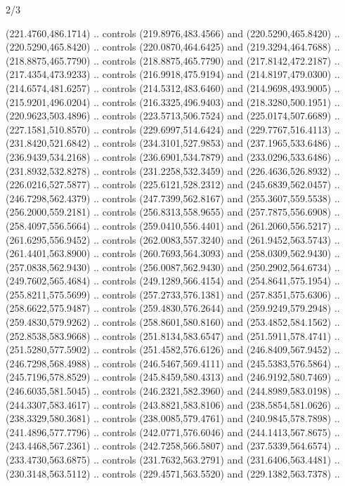 \begin{flagdescription}{2/3}
\begin{scope}[shift={(0.5\flaglength,0.5)},scale=\flagwidth/545]
\begin{scope}[y=0.80pt, x=0.80pt, yscale=-1,shift={(-297,-430)}]
\begin{scope}[shift={(28.51887,-25.61095)}]
  (221.4760,486.1714) .. controls (219.8976,483.4566) and (220.5290,465.8420) ..
  (220.5290,465.8420) .. controls (220.0870,464.6425) and (219.3294,464.7688) ..
  (218.8875,465.7790) .. controls (218.8875,465.7790) and (217.8142,472.2187) ..
  (217.4354,473.9233) .. controls (216.9918,475.9194) and (214.8197,479.0300) ..
  (214.6574,481.6257) .. controls (214.5312,483.6460) and (214.9698,493.9005) ..
  (215.9201,496.0204) .. controls (216.3325,496.9403) and (218.3280,500.1951) ..
  (220.9623,503.4896) .. controls (223.5713,506.7524) and (225.0174,507.6689) ..
  (227.1581,510.8570) .. controls (229.6997,514.6424) and (229.7767,516.4113) ..
  (231.8420,521.6842) .. controls (234.3101,527.9853) and (237.1965,533.6486) ..
  (236.9439,534.2168) .. controls (236.6901,534.7879) and (233.0296,533.6486) ..
  (231.8932,532.8278) .. controls (231.2258,532.3459) and (226.4636,526.8932) ..
  (226.0216,527.5877) .. controls (225.6121,528.2312) and (245.6839,562.0457) ..
  (246.7298,562.4379) .. controls (247.7399,562.8167) and (255.3607,559.5538) ..
  (256.2000,559.2181) .. controls (256.8313,558.9655) and (257.7875,556.6908) ..
  (258.4097,556.5664) .. controls (259.0410,556.4401) and (261.2060,556.5217) ..
  (261.6295,556.9452) .. controls (262.0083,557.3240) and (261.9452,563.5743) ..
  (261.4401,563.8900) .. controls (260.7693,564.3093) and (258.0309,562.9430) ..
  (257.0838,562.9430) .. controls (256.0087,562.9430) and (250.2902,564.6734) ..
  (249.7602,565.4684) .. controls (249.1289,566.4154) and (254.8641,575.1954) ..
  (255.8211,575.5699) .. controls (257.2733,576.1381) and (257.8351,575.6306) ..
  (258.6622,575.9487) .. controls (259.4830,576.2644) and (259.9249,579.2948) ..
  (259.4830,579.9262) .. controls (258.8601,580.8160) and (253.4852,584.1562) ..
  (252.8538,583.9668) .. controls (251.8134,583.6547) and (251.5911,578.4741) ..
  (251.5280,577.5902) .. controls (251.4582,576.6126) and (246.8409,567.9452) ..
  (246.7298,568.4988) .. controls (246.5467,569.4111) and (245.5383,576.5864) ..
  (245.7196,578.8529) .. controls (245.8459,580.4313) and (246.9192,580.7469) ..
  (246.6035,581.5045) .. controls (246.2321,582.3960) and (244.8989,583.0198) ..
  (244.3307,583.4617) .. controls (243.8821,583.8106) and (238.5854,581.0626) ..
  (238.3329,580.3681) .. controls (238.0085,579.4761) and (240.9845,578.7898) ..
  (241.4896,577.7796) .. controls (242.0771,576.6046) and (244.1413,567.8675) ..
  (243.4468,567.2361) .. controls (242.7258,566.5807) and (237.5339,564.6574) ..
  (233.4730,563.6875) .. controls (231.7632,563.2791) and (231.6406,563.4481) ..
  (230.3148,563.5112) .. controls (229.4571,563.5520) and (229.1382,563.7378) ..

\end{scope}
\end{scope}
\end{scope}
\end{flagdescription}

